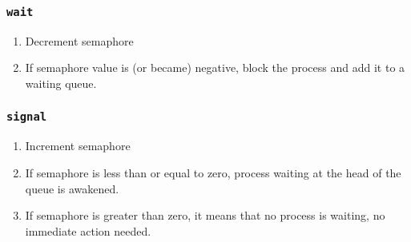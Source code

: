 \documentclass[11pt]{article}
\begin{document}
\subsubsection{\texttt{wait}}
\label{sec:org4cdc875}
\begin{enumerate}
\item Decrement semaphore
\item If semaphore value is (or became) negative, block the process and add it to a waiting queue.
\end{enumerate}

\subsubsection{\texttt{signal}}
\label{sec:orgf3aea07}
\begin{enumerate}
\item Increment semaphore
\item If semaphore is less than or equal to zero, process waiting at the head of the queue is awakened.
\item If semaphore is greater than zero, it means that no process is waiting, no immediate action needed.
\end{enumerate}
\end{document}
